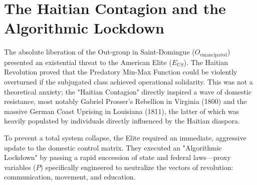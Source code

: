 \documentclass[12pt,openany]{book}
\begin{document}
\section{The Haitian Contagion and the Algorithmic Lockdown}

The absolute liberation of the Out-group in Saint-Domingue ($O_{\text{emancipated}}$) presented an existential threat to the American Elite ($E_{US}$). The Haitian Revolution proved that the Predatory Min-Max Function could be violently overturned if the subjugated class achieved operational solidarity. This was not a theoretical anxiety; the "Haitian Contagion" directly inspired a wave of domestic resistance, most notably Gabriel Prosser’s Rebellion in Virginia (1800) and the massive German Coast Uprising in Louisiana (1811), the latter of which was heavily populated by individuals directly influenced by the Haitian diaspora.

To prevent a total system collapse, the Elite required an immediate, aggressive update to the domestic control matrix. They executed an "Algorithmic Lockdown" by passing a rapid succession of state and federal laws—proxy variables ($P$) specifically engineered to neutralize the vectors of revolution: communication, movement, and education.
\end{document}
